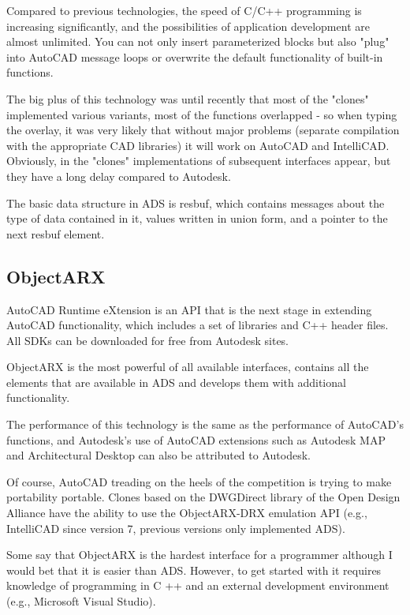 \documentclass[a4paper, 11pt, article]{report}
\begin{document}
Compared to previous technologies, the speed of C/C++ programming is increasing significantly, and the possibilities of application development are almost unlimited. You can not only insert parameterized blocks but also "plug" into AutoCAD message loops or overwrite the default functionality of built-in functions.

The big plus of this technology was until recently that most of the "clones" implemented various variants, most of the functions overlapped - so when typing the overlay, it was very likely that without major problems (separate compilation with the appropriate CAD libraries) it will work on AutoCAD and IntelliCAD. Obviously, in the "clones" implementations of subsequent interfaces appear, but they have a long delay compared to Autodesk.

The basic data structure in ADS is resbuf, which contains messages about the type of data contained in it, values written in union form, and a pointer to the next resbuf element.
 
\subsection{ObjectARX}

AutoCAD Runtime eXtension is an API that is the next stage in extending AutoCAD functionality, which includes a set of libraries and C++ header files. All SDKs can be downloaded for free from Autodesk sites.

ObjectARX is the most powerful of all available interfaces, contains all the elements that are available in ADS and develops them with additional functionality.

The performance of this technology is the same as the performance of AutoCAD's functions, and Autodesk's use of AutoCAD extensions such as Autodesk MAP and Architectural Desktop can also be attributed to Autodesk.

Of course, AutoCAD treading on the heels of the competition is trying to make portability portable. Clones based on the DWGDirect library of the Open Design Alliance have the ability to use the ObjectARX-DRX emulation API (e.g., IntelliCAD since version 7, previous versions only implemented ADS).

Some say that ObjectARX is the hardest interface for a programmer although I would bet that it is easier than ADS. However, to get started with it requires knowledge of programming in C ++ and an external development environment (e.g., Microsoft Visual Studio).
\end{document}

